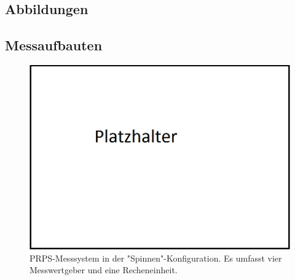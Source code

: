 %
%
%
\begin{appendix}

%

\normalsize
%
\chapter{Abbildungen}
\section{Messaufbauten}
\begin{figure}[h!]
 \centering
         \includegraphics[width=\textwidth]{img/00_Placeholder.png}
         \caption[PRPS-Kalibiersystem]{PRPS-Messsystem in der "Spinnen"-Konfiguration. Es umfasst vier Messwertgeber und eine Recheneinheit.}
         \label{fig:Spider1}
\end{figure}
\newpage
%
\begin{figure}[h!]
 \centering

\end{figure}
\end{appendix}
